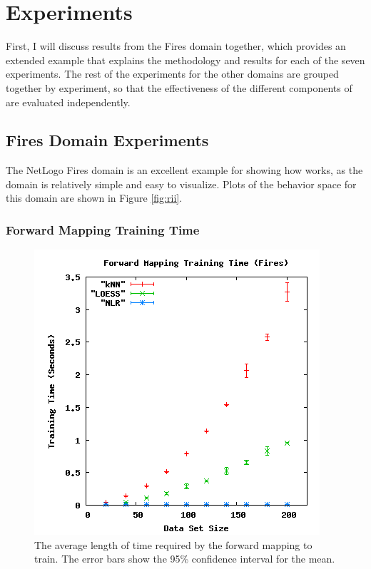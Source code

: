 \section{Experiments}\label{sec:exps}

First, I will discuss results from the Fires domain together, which provides an extended example that explains the methodology and results for each of the seven experiments.
The rest of the experiments  for the other domains are grouped together by experiment, so that the effectiveness of the different components of \fw are evaluated independently.

 \subsection{Fires Domain Experiments}

The NetLogo Fires domain is an excellent example for showing how \fw works, as the domain is relatively simple and easy to visualize.
Plots of the behavior space for this domain are shown in Figure \ref{fig:rii}.




\subsubsection{Forward Mapping Training Time}


\begin{figure}[ht]
\centering
\includegraphics[scale=.5]{images/results_fires/fmtraining.png}
\caption{The average length of time required by the forward mapping to train.
The error bars show the 95\% confidence interval for the mean.}
\label{fig:firefmtraining}
\end{figure}

